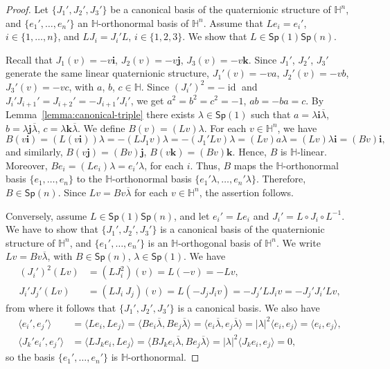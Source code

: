 \documentclass[12pt, a4paper]{amsart}
\newcommand{\id}{\operatorname{id}}
\renewcommand{\H}{\mathbb{H}}
\newcommand{\Sp}{\mathsf{Sp}}
\theoremstyle{remark}
\begin{document}
\begin{proof}
Let $\{J_1',J_2',J_3'\}$ be a canonical basis of the quaternionic structure of $\H^n$, and $\{e_1',\dots,e_n'\}$ an $\H$-orthonormal basis of $\H^n$.
Assume that $Le_i=e_i'$, $i\in\{1,\dots,n\}$, and $L J_i=J_i' L$, $i\in\{1,2,3\}$.
We show that $L\in\Sp(1)\Sp(n)$.

Recall that $J_1(v)=-v\mathbf{i}$, $J_2(v)=-v\mathbf{j}$, $J_3(v)=-v\mathbf{k}$.
Since $J_1'$, $J_2'$, $J_3'$ generate the same linear quaternionic structure, $J_1'(v)=-va$, $J_2'(v)=-vb$, $J_3'(v)=-vc$, with $a$, $b$, $c\in\H$.
Since $(J_i')^2=-\id$ and $J_i'J_{i+1}'=J_{i+2}'=-J_{i+1}'J_i'$, we get $a^2=b^2=c^2=-1$, $ab=-ba=c$.
By Lemma~\ref{lemma:canonical-triple} there exists $\lambda\in\Sp(1)$ such that $a=\lambda\mathbf{i}\overline{\lambda}$, $b=\lambda\mathbf{j}\overline{\lambda}$, $c=\lambda\mathbf{k}\overline{\lambda}$.
We define $B(v)=(Lv)\lambda$.
For each $v\in\H^n$, we have
\[
B(v\mathbf{i})
=(L(v\mathbf{i}))\lambda
=-(LJ_1v)\lambda
=-(J_1'Lv)\lambda
=(Lv)a\lambda
=(Lv)\lambda\mathbf{i}
=(Bv)\mathbf{i},
\]
and similarly, $B(v\mathbf{j})=(Bv)\mathbf{j}$, $B(v\mathbf{k})=(Bv)\mathbf{k}$.
Hence, $B$ is $\H$-linear.
Moreover, $Be_i=(Le_i)\lambda=e_i'\lambda$, for each $i$.
Thus, $B$ maps the $\H$-orthonormal basis $\{e_1,\dots,e_n\}$ to the $\H$-orthonormal basis $\{e_1'\lambda,\dots,e_n'\lambda\}$.
Therefore, $B\in\Sp(n)$.
Since $Lv=Bv\overline{\lambda}$ for each $v\in\H^n$, the assertion follows.

Conversely, assume $L\in\Sp(1)\Sp(n)$, and let $e_i'=Le_i$ and $J_i'=L\circ J_i\circ L^{-1}$.
We have to show that $\{J_1',J_2',J_3'\}$ is a canonical basis of the quaternionic structure of $\H^n$, and $\{e_1',\dots,e_n'\}$ is an $\H$-orthogonal basis of $\H^n$.
We write $Lv=Bv\overline{\lambda}$, with $B\in\Sp(n)$, $\lambda\in\Sp(1)$.
We have
\[
\begin{aligned}
(J_i')^2(Lv)
&{}=(L J_i^2)(v)
=L(-v)=-Lv,\\
J_i'J_j'(Lv)
&{}=(L J_i\ J_j)(v)
=L(-J_j J_i v)
=-J_j' L J_i v
=-J_j' J_i' Lv,
\end{aligned}
\]
from where it follows that $\{J_1',J_2',J_3'\}$ is a canonical basis.
We also have
\[
\begin{aligned}
\langle e_i',e_j'\rangle
&{}=\langle Le_i,Le_j\rangle
=\langle Be_i\overline{\lambda},Be_j\overline{\lambda}\rangle
=\langle e_i\overline{\lambda},e_j\overline{\lambda}\rangle
=\lvert\lambda\rvert^2\langle e_i,e_j\rangle
=\langle e_i,e_j\rangle,\\
\langle J_k'e_i',e_j'\rangle
&{}=\langle L J_k e_i,L e_j\rangle
=\langle BJ_k e_i\overline{\lambda},B e_j\overline{\lambda}\rangle
=\lvert\lambda\rvert^2\langle J_k e_i,e_j\rangle=0,
\end{aligned}
\]
so the basis $\{e_1',\dots,e_n'\}$ is $\H$-orthonormal.
\end{proof}
\end{document}

